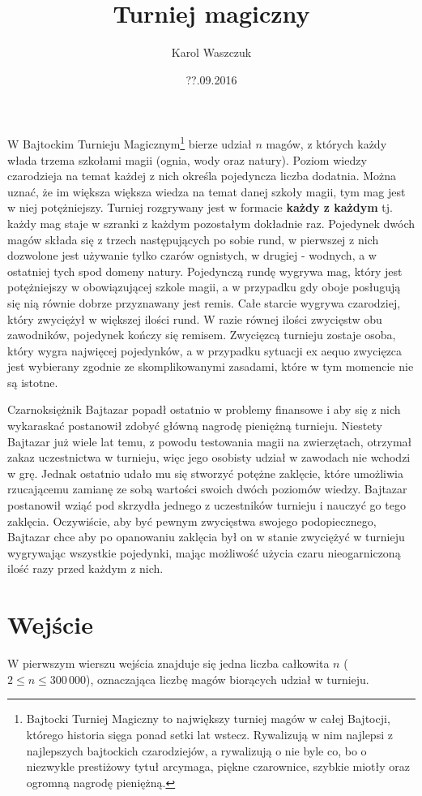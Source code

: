 \documentclass[zad,zawodnik,utf8]{sinol}
\title{Turniej magiczny}
\author{Karol Waszczuk} %
\date{??.09.2016}
\begin{document}
\begin{tasktext}%
W Bajtockim Turnieju Magicznym\footnote{Bajtocki Turniej Magiczny to największy turniej magów w całej Bajtocji, którego historia sięga ponad setki lat wstecz. Rywalizują w nim najlepsi z najlepszych bajtockich czarodziejów, a rywalizują o nie byle co, bo o niezwykle prestiżowy tytuł arcymaga, piękne czarownice, szybkie miotły oraz ogromną nagrodę pieniężną.} bierze udział $n$ magów, z których każdy włada trzema szkołami magii (ognia, wody oraz natury). Poziom wiedzy czarodzieja na temat każdej z nich określa pojedyncza liczba dodatnia. Można uznać, że im większa większa wiedza na temat danej szkoły magii, tym mag jest w niej potężniejszy. Turniej rozgrywany jest w formacie \textbf{każdy z każdym} tj. każdy mag staje w szranki z każdym pozostałym dokładnie raz. Pojedynek dwóch magów składa się z trzech następujących po sobie rund, w pierwszej z nich dozwolone jest używanie tylko czarów ognistych, w drugiej - wodnych, a w ostatniej tych spod domeny natury. Pojedynczą rundę wygrywa mag, który jest potężniejszy w obowiązującej szkole magii, a w przypadku gdy oboje posługują się nią równie dobrze przyznawany jest remis. Całe starcie wygrywa czarodziej, który zwyciężył w większej ilości rund. W razie równej ilości zwycięstw obu zawodników, pojedynek kończy się remisem. Zwycięzcą turnieju zostaje osoba, który wygra najwięcej pojedynków, a w przypadku sytuacji ex aequo zwycięzca jest wybierany zgodnie ze skomplikowanymi zasadami, które w tym momencie nie są istotne.

Czarnoksiężnik Bajtazar popadł ostatnio w problemy finansowe i aby się z nich wykaraskać postanowił zdobyć główną nagrodę pieniężną turnieju. Niestety Bajtazar już wiele lat temu, z powodu testowania magii na zwierzętach, otrzymał zakaz uczestnictwa w turnieju, więc jego osobisty udział w zawodach nie wchodzi w grę. Jednak ostatnio udało mu się stworzyć potężne zaklęcie, które umożliwia rzucającemu zamianę ze sobą wartości swoich dwóch poziomów wiedzy. Bajtazar postanowił wziąć pod skrzydła jednego z uczestników turnieju i nauczyć go tego zaklęcia. Oczywiście, aby być pewnym zwycięstwa swojego podopiecznego, Bajtazar chce aby po opanowaniu zaklęcia był on w stanie zwyciężyć w turnieju wygrywając wszystkie pojedynki, mając możliwość użycia czaru nieogarniczoną ilość razy przed każdym z nich.

  \section{Wejście}
W pierwszym wierszu wejścia znajduje się jedna liczba całkowita $n$ ($2 \leq n \leq 300\,000$), oznaczająca liczbę magów biorących udział w turnieju.


\end{tasktext}
\end{document}
